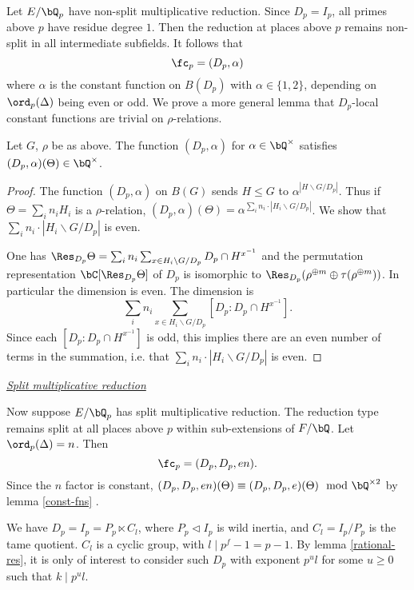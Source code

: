 Let $E / \bQ_p$ have non-split multiplicative reduction. Since $D_p = I_p$, all primes above $p$ have residue degree $1$. Then the reduction at places above $p$ remains non-split in all intermediate subfields.
It follows that 
\[ \fc_p = (D_p, \alpha) \]
where $\alpha$ is the constant function on $B(D_p)$ with $\alpha \in \{1, 2\}$, depending on $\ord_p(\Delta)$ being even or odd. 
We prove a more general lemma that $D_p$-local constant functions are trivial on $\rho$-relations.

\begin{lemma}\label{const-fns}
Let $G$, $\rho$ be as above. The function $(D_p, \alpha)$ for $\alpha \in \bQ^{\times}$ satisfies $(D_p, \alpha)(\Theta) \in \bQ^{\times}$.  
\end{lemma}   

\begin{proof}
    The function $(D_p, \alpha)$ on $B(G)$ sends $H \leq G$ to $\alpha^{| H \backslash G / D_p|}$. Thus if $\Theta = \sum_i n_i H_i$ is a $\rho$-relation, $(D_p, \alpha)(\Theta) = \alpha^{ \sum_i n_i \cdot | H_i \backslash G / D_p|}$. We show that $\sum_i n_i \cdot | H_i \backslash G / D_p|$ is even. 

    One has $\Res_{D_p} \Theta = \sum_i n_i \sum_{x \in H_i \backslash G / D_p} D_p \cap H^{x^{-1}}$ and the permutation representation $\bC[\Res_{D_p} \Theta]$ of $D_p$ is isomorphic to $\Res_{D_p} (\rho^{\oplus m} \oplus \tau(\rho^{\oplus m}))$. In particular the dimension is even. The dimension is $$\sum_i n_i \sum_{x \in H_i \backslash G / D_p} [D_p \colon D_p \cap H^{x^{-1}} ].$$ Since each $[D_p \colon D_p \cap H^{x^{-1}} ]$ is odd, this implies there are an even number of terms in the summation, i.e. that $\sum_i n_i \cdot | H_i \backslash G / D_p|$ is even. 
    
\end{proof}

\noindent\underline{\textit{Split multiplicative reduction}}

Now suppose $E / \bQ_p$ has split multiplicative reduction. The reduction type remains split at all places above $p$ within sub-extensions of $F / \bQ$. Let $\ord_p(\Delta) = n$. Then 
\[ \fc_p = (D_p, D_p, en). \]
Since the $n$ factor is constant, $(D_p, D_p, en)(\Theta) \equiv (D_p, D_p, e)(\Theta) \mod \bQ^{\times 2}$ by lemma \ref{const-fns} .

We have $D_p = I_p = P_p \ltimes C_l$, where $P_p \triangleleft I_p$ is wild inertia, and $C_l = I_p / P_p$ is the tame quotient. $C_l$ is a cyclic group, with $l \mid p^f - 1 = p - 1$. By lemma \ref{rational-res}, it is only of interest to consider such $D_p$ with exponent  $p^u l$ for some $u \geq 0$ such that $k \mid p^u l$.

